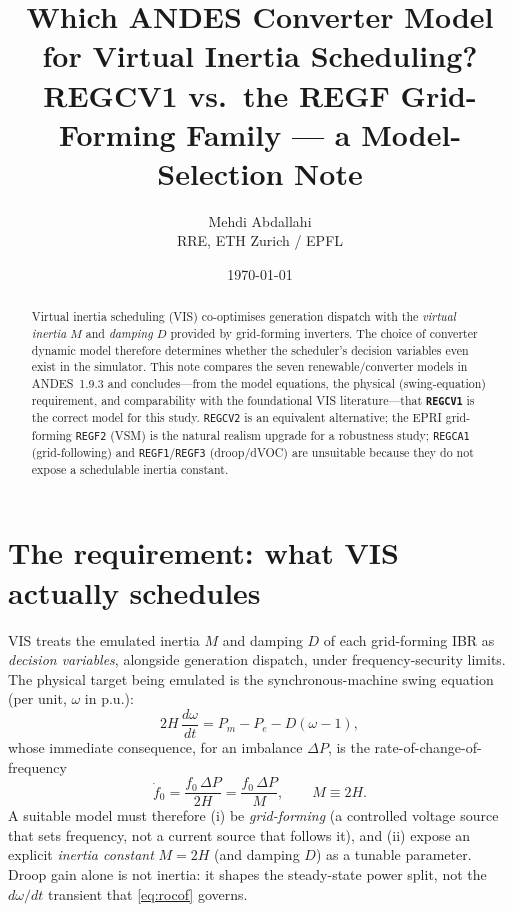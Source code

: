 \documentclass[11pt,a4paper]{article}
\title{\textbf{Which ANDES Converter Model for Virtual Inertia Scheduling?}\\[2pt]
\large REGCV1 vs.\ the REGF Grid-Forming Family --- a Model-Selection Note}
\author{Mehdi Abdallahi \\ \small RRE, ETH Zurich / EPFL}
\date{\today}
\newcommand{\model}[1]{\texttt{#1}}
\begin{document}
\maketitle

\begin{abstract}
\noindent Virtual inertia scheduling (VIS) co-optimises generation dispatch with
the \emph{virtual inertia} $M$ and \emph{damping} $D$ provided by grid-forming
inverters. The choice of converter dynamic model therefore determines whether the
scheduler's decision variables even exist in the simulator. This note compares the
seven renewable/converter models in ANDES~1.9.3 and concludes---from the model
equations, the physical (swing-equation) requirement, and comparability with the
foundational VIS literature---that \textbf{\model{REGCV1}} is the correct model for
this study. \model{REGCV2} is an equivalent alternative; the EPRI grid-forming
\model{REGF2} (VSM) is the natural realism upgrade for a robustness study;
\model{REGCA1} (grid-following) and \model{REGF1}/\model{REGF3} (droop/dVOC) are
unsuitable because they do not expose a schedulable inertia constant.
\end{abstract}

\section{The requirement: what VIS actually schedules}
VIS treats the emulated inertia $M$ and damping $D$ of each grid-forming IBR as
\emph{decision variables}, alongside generation dispatch, under frequency-security
limits. The physical target being emulated is the synchronous-machine swing
equation (per unit, $\omega$ in p.u.):
\begin{equation}
2H\,\frac{d\omega}{dt} = P_m - P_e - D(\omega-1),
\label{eq:swing}
\end{equation}
whose immediate consequence, for an imbalance $\Delta P$, is the
rate-of-change-of-frequency
\begin{equation}
\dot f_0 = \frac{f_0\,\Delta P}{2H} = \frac{f_0\,\Delta P}{M},\qquad M \equiv 2H.
\label{eq:rocof}
\end{equation}
A suitable model must therefore (i) be \emph{grid-forming} (a controlled voltage
source that sets frequency, not a current source that follows it), and (ii)
expose an explicit \emph{inertia constant} $M{=}2H$ (and damping $D$) as a
tunable parameter. Droop gain alone is not inertia: it shapes the steady-state
power split, not the $d\omega/dt$ transient that \eqref{eq:rocof} governs.
\end{document}
